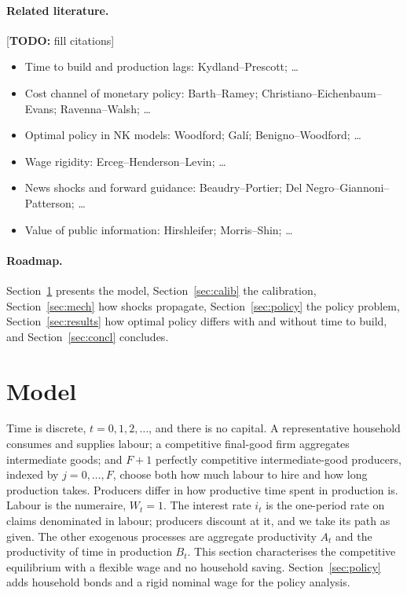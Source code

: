\documentclass[11pt]{article}
\theoremstyle{definition}
\newcommand{\todo}[1]{{\color{red}\small[\textbf{TODO:} #1]}}
\begin{document}
\paragraph{Related literature.}
\todo{fill citations}
\begin{itemize}
  \item Time to build and production lags: Kydland--Prescott; \ldots
  \item Cost channel of monetary policy: Barth--Ramey; Christiano--Eichenbaum--Evans; Ravenna--Walsh; \ldots
  \item Optimal policy in NK models: Woodford; Gal\'{i}; Benigno--Woodford; \ldots
  \item Wage rigidity: Erceg--Henderson--Levin; \ldots
  \item News shocks and forward guidance: Beaudry--Portier; Del Negro--Giannoni--Patterson; \ldots
  \item Value of public information: Hirshleifer; Morris--Shin; \ldots
\end{itemize}

\paragraph{Roadmap.}
Section~\ref{sec:model} presents the model, Section~\ref{sec:calib} the calibration,
Section~\ref{sec:mech} how shocks propagate, Section~\ref{sec:policy} the policy problem,
Section~\ref{sec:results} how optimal policy differs with and without time to build, and
Section~\ref{sec:concl} concludes.

\section{Model}\label{sec:model}

Time is discrete, $t=0,1,2,\dots$, and there is no capital. A representative household consumes
and supplies labour; a competitive final-good firm aggregates intermediate goods; and $F+1$
perfectly competitive intermediate-good producers, indexed by $j=0,\dots,F$, choose both how much
labour to hire and how long production takes. Producers differ in how productive time spent in
production is. Labour is the numeraire, $W_t=1$. The interest rate $i_t$ is the one-period rate on
claims denominated in labour; producers discount at it, and we take its path as given. The other
exogenous processes are aggregate productivity $A_t$ and the productivity of time in production
$B_t$. This section characterises the competitive equilibrium with a flexible wage and no
household saving. Section~\ref{sec:policy} adds household bonds and a rigid nominal wage for the
policy analysis.
\end{document}

